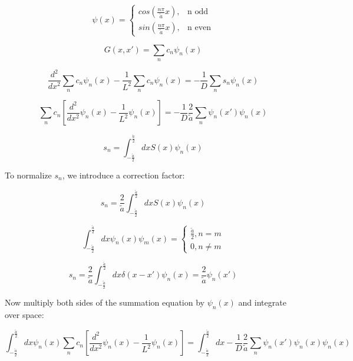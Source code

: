 \documentclass[12pt]{article}
\begin{document}
\begin{equation*}
  \psi(x)=\begin{cases}
    cos(\tfrac{n\pi}{\tilde{a}}x), & \text{n odd} \\
    sin(\tfrac{n\pi}{\tilde{a}}x), & \text{n even}
  \end{cases}
\end{equation*}

\begin{equation*}
G(x,x') = \sum_n c_n \psi_n(x)
\end{equation*}

\begin{equation*}
\frac{d^2}{dx^2}\sum_n c_n \psi_n(x) - \frac{1}{L^2}\sum_n c_n \psi_n(x)=-\frac{1}{D}\sum_n s_n \psi_n(x)
\end{equation*}

\begin{equation*}
\sum_n c_n\left[\frac{d^2}{dx^2}\psi_n(x) - \frac{1}{L^2}\psi_n(x)\right] =
-\frac{1}{D}\frac{2}{\tilde{a}}\sum_n \psi_n(x') \psi_n(x)
\end{equation*}

\begin{equation*}
s_n = \int_{-\tfrac{\tilde{a}}{2}}^{\tfrac{\tilde{a}}{2}}dxS(x)\psi_n(x)
\end{equation*}

To normalize $s_n$, we introduce a correction factor:

\begin{equation*}
s_n = \frac{2}{\tilde{a}}\int_{-\tfrac{\tilde{a}}{2}}^{\tfrac{\tilde{a}}{2}}dxS(x)\psi_n(x)
\end{equation*}

\begin{equation*}
\int_{-\tfrac{\tilde{a}}{2}}^{\tfrac{\tilde{a}}{2}}dx\psi_n(x)\psi_m(x) =\begin{cases}
	\tfrac{\tilde{a}}{2}, n = m \\
	0, n \neq m
	\end{cases}
\end{equation*}

\begin{equation*}
s_n = \frac{2}{\tilde{a}}\int_{-\tfrac{\tilde{a}}{2}}^{\tfrac{\tilde{a}}{2}}dx\delta(x-x')\psi_n(x)
= \frac{2}{\tilde{a}}\psi_n(x')
\end{equation*}

Now multiply both sides of the summation equation by $\psi_n(x)$ and integrate over space:

\begin{equation*}
\int_{-\tfrac{\tilde{a}}{2}}^{\tfrac{\tilde{a}}{2}}dx\psi_n(x)
\sum_n c_n\left[\frac{d^2}{dx^2}\psi_n(x) - \frac{1}{L^2}\psi_n(x)\right] =
\int_{-\tfrac{\tilde{a}}{2}}^{\tfrac{\tilde{a}}{2}}dx
-\frac{1}{D}\frac{2}{\tilde{a}}\sum_n \psi_n(x') \psi_n(x)\psi_n(x)
\end{equation*}
\end{document}
